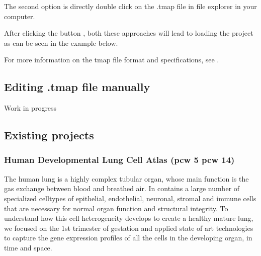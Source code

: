 \documentclass[letterpaper,10pt,english,openany,oneside]{sphinxmanual}
\begin{document}
\sphinxAtStartPar
{}

\sphinxAtStartPar
The second option is directly double click on the .tmap file in file explorer in your computer.

\sphinxAtStartPar
{}

\sphinxAtStartPar
After clicking the button , both these approaches will lead to loading the project as can be seen in the example below.

\sphinxAtStartPar
{}

\sphinxAtStartPar
For more information on the tmap file format and specifications, see {\hyperref[\detokenize{docs/advanced/tmap:the-tmap-file-format}]{}}.


\subsection{Editing .tmap file manually}
\label{\detokenize{docs/starting/projects:editing-tmap-file-manually}}
\sphinxAtStartPar
Work in progress


\subsection{Existing projects}
\label{\detokenize{docs/starting/projects:existing-projects}}

\subsubsection{Human Developmental Lung Cell Atlas (pcw 5\sphinxhyphen{} pcw 14)}
\label{\detokenize{docs/starting/projects:human-developmental-lung-cell-atlas-pcw-5-pcw-14}}
\sphinxAtStartPar
The human lung is a highly complex tubular organ, whose main function is the gas exchange between blood and breathed air. In contains a large number of specialized cell\sphinxhyphen{}types of epithelial, endothelial, neuronal, stromal and immune cells that are necessary for normal organ function and structural integrity. To understand how this cell heterogeneity develops to create a healthy mature lung, we focused on the 1st trimester of gestation and applied state of art technologies to capture the gene expression profiles of all the cells in the developing organ, in time and space.

\sphinxAtStartPar
{}
\end{document}
